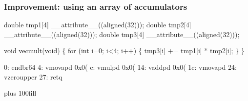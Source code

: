 \documentclass{beamer}
\begin{document}
\begin{frame}[fragile]
\frametitle{Improvement: using an array of accumulators}
\begin{semiverbatim}
\scriptsize

double tmp1[4] __attribute__((aligned(32)));
double tmp2[4] __attribute__((aligned(32)));
double tmp3[4] __attribute__((aligned(32)));

void vecmult(void)
\{
    for (int i=0; i<4; i++) \{
        tmp3[i] += tmp1[i] * tmp2[i];
    \}
\}

0:   endbr64
4:   vmovapd     0x0(%
c:   vmulpd      0x0(%
14:  vaddpd      0x0(%
1c:  vmovapd     %
24:  vzeroupper
27:  retq

\end{semiverbatim}
\vskip 0pt plus 100fill
\end{frame}
\end{document}
